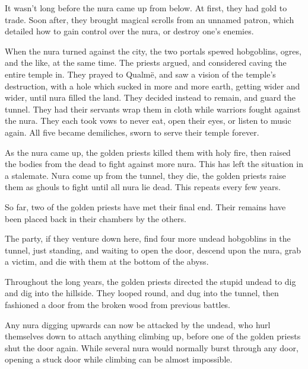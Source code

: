 \begin{multicols}{2}
\begin{exampletext}
It wasn't long before the nura came up from below.  At first, they had gold to trade.  Soon after, they brought magical scrolls from an unnamed patron, which detailed how to gain control over the nura, or destroy one's enemies.

When the nura turned against the city, the two portals spewed hobgoblins, ogres, and the like, at the same time.
The priests argued, and considered caving the entire temple in.
They prayed to Qualm\"{e}, and saw a vision of the temple's destruction, with a hole which sucked in more and more earth, getting wider and wider, until nura filled the land.
They decided instead to remain, and guard the tunnel.
They had their servants wrap them in cloth while warriors fought against the nura.
They each took vows to never eat, open their eyes, or listen to music again.
All five became demiliches, sworn to serve their temple forever.

As the nura came up, the golden priests killed them with holy fire, then raised the bodies from the dead to fight against more nura.  This has left the situation in a stalemate.  Nura come up from the tunnel, they die, the golden priests raise them as ghouls to fight until all nura lie dead.  This repeats every few years.

So far, two of the golden priests have met their final end.  Their remains have been placed back in their chambers by the others.

\end{exampletext}


The party, if they venture down here, find four more undead hobgoblins in the tunnel, just standing, and waiting to open the door, descend upon the nura, grab a victim, and die with them at the bottom of the abyss.

\begin{exampletext}

	Throughout the long years, the golden priests directed the stupid undead to dig and dig into the hillside.
	They looped round, and dug into the tunnel, then fashioned a door from the broken wood from previous battles.

Any nura digging upwards can now be attacked by the undead, who hurl themselves down to attach anything climbing up, before one of the golden priests shut the door again.
While several nura would normally burst through any door, opening a stuck door while climbing can be almost impossible.

\end{exampletext}

\end{multicols}

